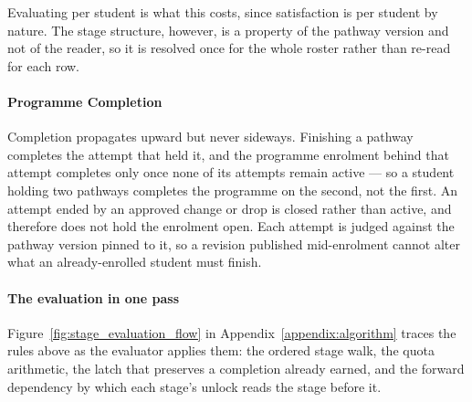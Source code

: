 Evaluating per student is what this costs, since satisfaction is per student by nature. The stage structure, however, is a property of the pathway version and not of the reader, so it is resolved once for the whole roster rather than re-read for each row.

\paragraph{Programme Completion}
Completion propagates upward but never sideways. Finishing a pathway completes the attempt that held it, and the programme enrolment behind that attempt completes only once none of its attempts remain active — so a student holding two pathways completes the programme on the second, not the first. An attempt ended by an approved change or drop is closed rather than active, and therefore does not hold the enrolment open. Each attempt is judged against the pathway version pinned to it, so a revision published mid-enrolment cannot alter what an already-enrolled student must finish.

\paragraph{The evaluation in one pass}
Figure~\ref{fig:stage_evaluation_flow} in Appendix~\ref{appendix:algorithm}
traces the rules above as the evaluator applies them: the ordered stage walk,
the quota arithmetic, the latch that preserves a completion already earned, and
the forward dependency by which each stage's unlock reads the stage before it.
